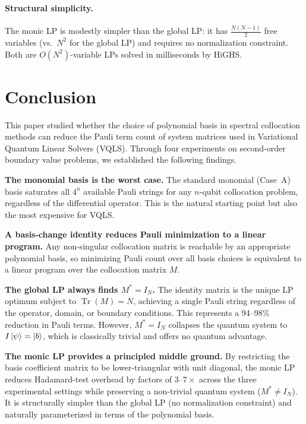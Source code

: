 \documentclass[a4paper,12pt]{amsart}
\begin{document}
\paragraph{Structural simplicity.}
The monic LP is modestly simpler than the global LP: it has $\tfrac{N(N-1)}{2}$ free variables (vs.\ $N^2$ for the global LP) and requires no normalization constraint. Both are $O(N^2)$-variable LPs solved in milliseconds by HiGHS.

\section{Conclusion}

This paper studied whether the choice of polynomial basis in spectral collocation methods can reduce the Pauli term count of system matrices used in Variational Quantum Linear Solvers (VQLS). Through four experiments on second-order boundary value problems, we established the following findings.

\textbf{The monomial basis is the worst case.} The standard monomial (Case~A) basis saturates all $4^n$ available Pauli strings for any $n$-qubit collocation problem, regardless of the differential operator. This is the natural starting point but also the most expensive for VQLS.

\textbf{A basis-change identity reduces Pauli minimization to a linear program.} Any non-singular collocation matrix is reachable by an appropriate polynomial basis, so minimizing Pauli count over all basis choices is equivalent to a linear program over the collocation matrix $M$.

\textbf{The global LP always finds $M^*=I_N$.} The identity matrix is the unique LP optimum subject to $\operatorname{Tr}(M)=N$, achieving a single Pauli string regardless of the operator, domain, or boundary conditions. This represents a 94--98\% reduction in Pauli terms. However, $M^*=I_N$ collapses the quantum system to $I\ket{\psi}=\ket{b}$, which is classically trivial and offers no quantum advantage.

\textbf{The monic LP provides a principled middle ground.} By restricting the basis coefficient matrix to be lower-triangular with unit diagonal, the monic LP reduces Hadamard-test overhead by factors of $3$--$7\times$ across the three experimental settings while preserving a non-trivial quantum system ($M^* \neq I_N$). It is structurally simpler than the global LP (no normalization constraint) and naturally parameterized in terms of the polynomial basis.
\end{document}
